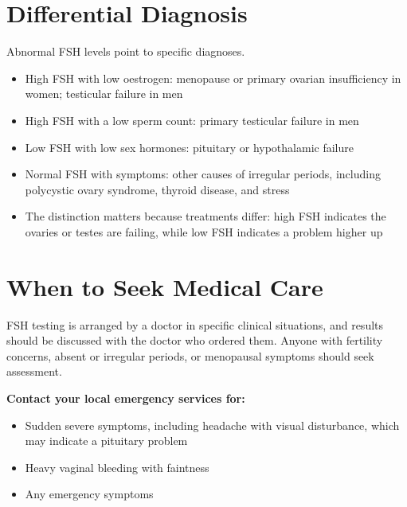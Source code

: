 \section*{Differential Diagnosis}
Abnormal FSH levels point to specific diagnoses.
\begin{itemize}
    \item High FSH with low oestrogen: menopause or primary ovarian insufficiency in women; testicular failure in men
    \item High FSH with a low sperm count: primary testicular failure in men
    \item Low FSH with low sex hormones: pituitary or hypothalamic failure
    \item Normal FSH with symptoms: other causes of irregular periods, including polycystic ovary syndrome, thyroid disease, and stress
    \item The distinction matters because treatments differ: high FSH indicates the ovaries or testes are failing, while low FSH indicates a problem higher up
\end{itemize}

\section*{When to Seek Medical Care}
FSH testing is arranged by a doctor in specific clinical situations, and results should be discussed with the doctor who ordered them. Anyone with fertility concerns, absent or irregular periods, or menopausal symptoms should seek assessment.

\textbf{Contact your local emergency services for:}
\begin{itemize}
    \item Sudden severe symptoms, including headache with visual disturbance, which may indicate a pituitary problem
    \item Heavy vaginal bleeding with faintness
    \item Any emergency symptoms
\end{itemize}


